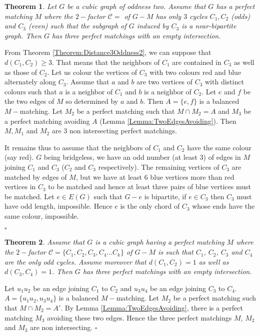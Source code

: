 \documentclass{elsart}
\theoremstyle{plain} \theoremheaderfont{\scshape}
\newtheorem{Thm}{\bf Theorem}
\newenvironment{Prf}{{\bf \noindent Proof } }{\hfill$\square$\\}
\begin{document}
\begin{Thm} \label{Theorem:3cyclesOddness2}Let $G$ be a cubic graph of oddness two. Assume that $G$
has a perfect matching $M$ where the $2-$factor $\mathcal C=$ of
$G-M$ has only $3$ cycles $C_1,C_2$ (odds) and $ C_3$ (even) such
that the subgraph of $G$ induced by $C_3$ is a near-bipartite graph.
Then $G$ has three perfect matchings with an empty intersection.
\end{Thm}
\begin{Prf}
From Theorem \ref{Theorem:Distance3Oddness2}, we can suppose that
$d(C_1,C_2) \geq 3$. That means that the neighbors of $C_1$ are
contained in $C_3$ as well as those of $C_2$. Let us colour the
vertices of $C_3$ with two colours red and blue alternately along
$C_3$. Assume that $a$ and $b$ are two vertices of $C_3$ with
distinct colours such that $a$ is a neighbor of $C_1$ and $b$ is a
neighbor of $C_2$. Let $e$ and $f$ be the two edges of $M$ so
determined by $a$ and $b$. Then $A=\{e,f\}$ is a balanced
$M-$matching. Let $M_2$ be a perfect matching such that $M \cap
M_2=A$ and $M_3$ be a perfect matching avoiding $A$ (Lemma
\ref{Lemma:TwoEdgesAvoiding}). Then $M,M_1$ and $M_2$ are $3$ non
intersecting perfect matchings.

It remains thus to assume that the neighbors of $C_1$ and $C_2$ have
the same colour (say red). $G$ being bridgeless, we have an odd
number (at least $3$) of edges in $M$ joining $C_1$ and $C_3$ ($C_2$
and $C_3$ respectively). The remaining vertices of $C_3$ are matched
by edges of $M$, but we have at least $6$ blue vertices more than
red vertices in $C_3$ to be matched and hence at least three pairs
of blue vertices must be matched. Let $e \in E(G)$ such that $G-e$
is bipartite, if $e\in C_3$ then $C_3$ must have odd length,
impossible. Hence $e$ is the only chord of $C_3$ whose ends have the
same colour, impossible.

\end{Prf}
\begin{Thm} \label{Theorem:Oddness4Distance1}
Assume that $G$ is a cubic graph having a perfect matching $M$ where
the $2-$factor $\mathcal C=\{C_1,C_2,C_3,C_4 \ldots C_k\}$ of $G-M$
is such that $C_1$, $C_2$, $C_3$ and $C_4$ are the only odd cycles.
Assume moreover that $d(C_1,C_2) =1$ as well as $d(C_3,C_4)=1$. Then
$G$ has three perfect matchings with an empty intersection.
\end{Thm}
\begin{Prf}
Let $u_1u_2$ be an edge joining $C_1$ to $C_2$ and $u_3u_4$ be an
edge joining $C_3$ to $C_4$. $A=\{u_1u_2,u_3u_4\}$ is a balanced
$M-$matching. Let $M_2$ be a perfect matching such that $M \cap M_2
= A'$. By Lemma \ref{Lemma:TwoEdgesAvoiding}, there is a perfect
matching $M_3$ avoiding these two edges. Hence the three perfect
matchings $M$, $M_2$ and $M_3$ are non intersecting.
\end{Prf}
\end{document}

